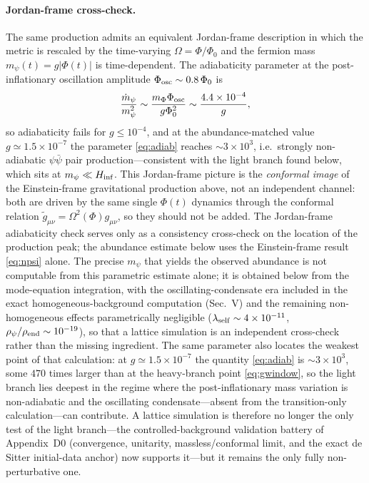 \documentclass[pdflatex,sn-mathphys-num]{sn-jnl}
\providecommand{\lesssim}{\leq}
\newcommand{\PhiV}{\Phi_0}
\theoremstyle{thmstyleone}
\begin{document}
\paragraph{Jordan-frame cross-check.} The same production admits an equivalent Jordan-frame description in which the metric is rescaled by the time-varying $\Omega=\Phi/\PhiV$ and the fermion mass $m_\psi(t)=g|\Phi(t)|$ is time-dependent. The adiabaticity parameter at the post-inflationary oscillation amplitude $\Phi_{\rm osc}\sim0.8\,\PhiV$ is
\begin{equation}
\frac{\dot m_\psi}{m_\psi^2}\sim\frac{m_\Phi\Phi_{\rm osc}}{g\PhiV^2}\sim\frac{4.4\times10^{-4}}{g},
\label{eq:adiab}
\end{equation}
so adiabaticity fails for $g\lesssim10^{-4}$, and at the abundance-matched value $g\simeq1.5\times10^{-7}$ the parameter \eqref{eq:adiab} reaches $\sim3\times10^{3}$, i.e.\ strongly non-adiabatic $\psi\bar\psi$ pair production---consistent with the light branch found below, which sits at $m_\psi\ll H_{\rm inf}$. This Jordan-frame picture is the \emph{conformal image} of the Einstein-frame gravitational production above, not an independent channel: both are driven by the same single $\Phi(t)$ dynamics through the conformal relation $\tilde g_{\mu\nu}=\Omega^2(\Phi)g_{\mu\nu}$, so they should not be added. The Jordan-frame adiabaticity check serves only as a consistency cross-check on the location of the production peak; the abundance estimate below uses the Einstein-frame result \eqref{eq:npsi} alone. The precise $m_\psi$ that yields the observed abundance is not computable from this parametric estimate alone; it is obtained below from the mode-equation integration, with the oscillating-condensate era included in the exact homogeneous-background computation (Sec.~V) and the remaining non-homogeneous effects parametrically negligible ($\lambda_{\rm self}\sim4\times10^{-11}$, $\rho_\psi/\rho_{\rm end}\sim10^{-19}$), so that a lattice simulation is an independent cross-check rather than the missing ingredient. The same parameter also locates the weakest point of that calculation: at $g\simeq1.5\times10^{-7}$ the quantity \eqref{eq:adiab} is $\sim3\times10^{3}$, some $470$ times larger than at the heavy-branch point \eqref{eq:gwindow}, so the light branch lies deepest in the regime where the post-inflationary mass variation is non-adiabatic and the oscillating condensate---absent from the transition-only calculation---can contribute. A lattice simulation is therefore no longer the only test of the light branch---the controlled-background validation battery of Appendix~D0 (convergence, unitarity, massless/conformal limit, and the exact de Sitter initial-data anchor) now supports it---but it remains the only fully non-perturbative one.
\end{document}
